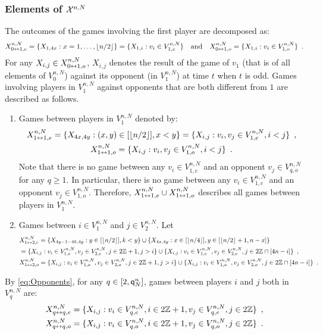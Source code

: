 \subsubsection*{Elements of $\mathcal{X}^{n,N}$}
The outcomes of the games involving the first player are decomposed as:
\[
X_{0\leftrightarrow1,e}^{n,N}=\{X_{1,4x} : x=1,\ldots,\left\lfloor n/2\right\rfloor\}=\{X_{1,i} : v_i\in V_{1,e}^{n,N}\}\quad\mbox{and}\quad X_{0\leftrightarrow 1,o}^{n,N}=\{X_{1,i} : v_i\in V_{1,o}^{n,N}\}\enspace.
\]
For any $X_{i,j}\in X_{0\leftrightarrow 1,o}^{n,N}$, $X_{i,j}$ denotes the result of the game of $v_1$ (that is of all elements of $V_{0}^{n,N}$) against its opponent (in $V_{1}^{n,N}$) at time $t$ when $t$ is odd. Games involving players in $V_{1}^{n,N}$ against opponents that are both different from $1$ are described as follows.
\begin{enumerate}[-]
\item  Games between players in $V_{1}^{n,N}$ denoted by: 
\begin{gather*}
X_{1\leftrightarrow1,e}^{n,N}=\{X_{4x,4y} : (x,y)\in [\left\lfloor n/2\right\rfloor], x< y\}=\{X_{i,j} : v_i,v_j\in V_{1,e}^{n,N},i<j\}\enspace,\\
X_{1\leftrightarrow1,o}^{n,N}=\{X_{i,j} : v_i,v_j\in V_{1,o}^{n,N},i<j\}\enspace. 
\end{gather*}
Note that there is no game between any $v_i\in V_{1,e}^{n,N}$ and an opponent $v_j\in V_{q,o}^{n,N}$ for any $q\ge 1$. In particular, there is no game between any $v_i\in V_{1,e}^{n,N}$ and an opponent $v_j\in V_{1,o}^{n,N}$.  Therefore, $X_{1\leftrightarrow1,e}^{n,N}\cup X_{1\leftrightarrow1,o}^{n,N}$ describes all games between players in $V_{1}^{n,N}$. 
\item Games between $i\in V_{1}^{n,N}$ and $j\in V_{2}^{n,N}$. Let 
\begin{align*}
&X_{1\leftrightarrow2,e}^{n,N}=\{X_{4y-1-4k,4y} : y\in [\left\lfloor n/2\right\rfloor], k<y\}\cup\{X_{4x,4y} : x\in[\left\lfloor n/4\right\rfloor], y\in[\left\lfloor n/2\right\rfloor+1,n-x]\}\\
&=\{X_{i,j} : v_i\in V_{1,e}^{n,N},v_j\in V_{2,e}^{n,N},j\in 2\mathbb{Z}+1,j>i\}\cup\{X_{i,j} : v_i\in V_{1,e}^{n,N},v_j\in V_{2,e}^{n,N},j\in 2\mathbb{Z}\cap [4n-i]\}\enspace,\\
&X_{1\leftrightarrow2,o}^{n,N}=\{X_{i,j} : v_i\in V_{1,o}^{n,N},v_j\in V_{2,o}^{n,N},j\in 2\mathbb{Z}+1,j>i\}\cup\{X_{i,j} : v_i\in V_{1,o}^{n,N},v_j\in V_{2,o}^{n,N},j\in 2\mathbb{Z}\cap [4n-i]\}\enspace.
\end{align*}
\end{enumerate}
By \eqref{eq:Opponents}, for any $q\in [2,{\mathsf{q}}^{n}_{N}]$, games between players $i$ and $j$ both in $V_{q}^{n,N}$ are:
\begin{align}
 \notag X_{q \leftrightarrow q,e}^{n,N}&=\{X_{i,j} : v_i\in V_{q,e}^{n,N},i\in 2\mathbb{Z}+1, v_j\in V_{q,e}^{n,N},j\in 2\mathbb{Z}\}\enspace,\\
\label{Def:Vqtoq}  X_{q\leftrightarrow q,o}^{n,N}&=\{X_{i,j} : v_i\in V_{q,o}^{n,N},i\in 2\mathbb{Z}+1, v_j\in V_{q,o}^{n,N},j\in 2\mathbb{Z}\}\enspace.
\end{align}
